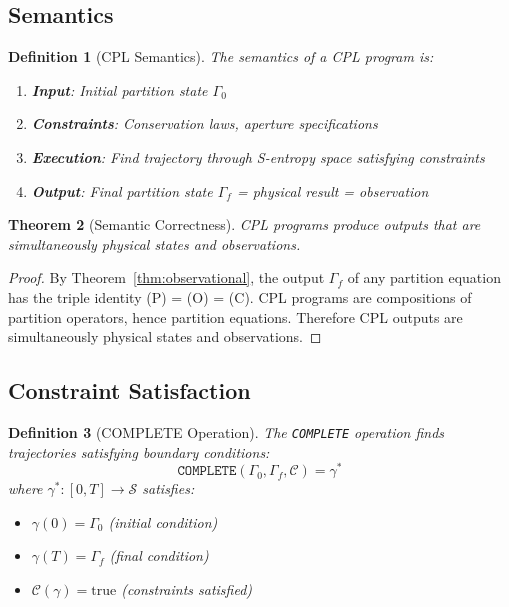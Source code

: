 \documentclass[aps,prd,twocolumn,superscriptaddress,floatfix,nofootinbib]{revtex4-2}
\newtheorem{theorem}{Theorem}[section]
\newtheorem{definition}[theorem]{Definition}
\theoremstyle{remark}
\newcommand{\Sspace}{\mathcal{S}}
\newcommand{\Gstate}{\Gamma}
\begin{document}
\subsection{Semantics}

\begin{definition}[CPL Semantics]
\label{def:cpl_semantics}
The semantics of a CPL program is:
\begin{enumerate}
\item \textbf{Input}: Initial partition state $\Gstate_0$
\item \textbf{Constraints}: Conservation laws, aperture specifications
\item \textbf{Execution}: Find trajectory through S-entropy space satisfying constraints
\item \textbf{Output}: Final partition state $\Gstate_f$ = physical result = observation
\end{enumerate}
\end{definition}

\begin{theorem}[Semantic Correctness]
\label{thm:semantic_correct}
CPL programs produce outputs that are simultaneously physical states and observations.
\end{theorem}

\begin{proof}
By Theorem~\ref{thm:observational}, the output $\Gstate_f$ of any partition equation has the triple identity (P) = (O) = (C). CPL programs are compositions of partition operators, hence partition equations. Therefore CPL outputs are simultaneously physical states and observations.
\end{proof}

\subsection{Constraint Satisfaction}

\begin{definition}[COMPLETE Operation]
\label{def:complete}
The \texttt{COMPLETE} operation finds trajectories satisfying boundary conditions:
\begin{equation}
\texttt{COMPLETE}(\Gstate_0, \Gstate_f, \mathcal{C}) = \gamma^*
\end{equation}
where $\gamma^*: [0,T] \to \Sspace$ satisfies:
\begin{itemize}
\item $\gamma(0) = \Gstate_0$ (initial condition)
\item $\gamma(T) = \Gstate_f$ (final condition)
\item $\mathcal{C}(\gamma) = \text{true}$ (constraints satisfied)
\end{itemize}
\end{definition}
\end{document}

